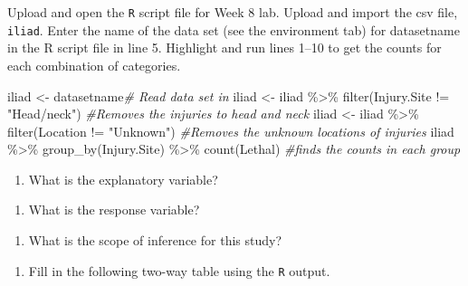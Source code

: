 \documentclass[
]{report}
\newenvironment{Shaded}{\begin{snugshade}}{\end{snugshade}}
\newcommand{\CommentTok}[1]{\textcolor[rgb]{0.56,0.35,0.01}{\textit{#1}}}
\newcommand{\FunctionTok}[1]{\textcolor[rgb]{0.00,0.00,0.00}{#1}}
\newcommand{\NormalTok}[1]{#1}
\newcommand{\OtherTok}[1]{\textcolor[rgb]{0.56,0.35,0.01}{#1}}
\newcommand{\SpecialCharTok}[1]{\textcolor[rgb]{0.00,0.00,0.00}{#1}}
\newcommand{\StringTok}[1]{\textcolor[rgb]{0.31,0.60,0.02}{#1}}
\providecommand{\tightlist}{%
  \setlength{\itemsep}{0pt}\setlength{\parskip}{0pt}}
\begin{document}
Upload and open the \texttt{R} script file for Week 8 lab. Upload and import the csv file, \texttt{iliad}. Enter the name of the data set (see the environment tab) for datasetname in the R script file in line 5. Highlight and run lines 1--10 to get the counts for each combination of categories.

\begin{Shaded}
\begin{Highlighting}[]
\NormalTok{iliad }\OtherTok{\textless{}{-}}\NormalTok{ datasetname}\CommentTok{\# Read data set in}
\NormalTok{iliad }\OtherTok{\textless{}{-}}\NormalTok{ iliad }\SpecialCharTok{\%\textgreater{}\%}
  \FunctionTok{filter}\NormalTok{(Injury.Site }\SpecialCharTok{!=} \StringTok{"Head/neck"}\NormalTok{) }\CommentTok{\#Removes the injuries to head and neck}
\NormalTok{iliad }\OtherTok{\textless{}{-}}\NormalTok{ iliad }\SpecialCharTok{\%\textgreater{}\%}
  \FunctionTok{filter}\NormalTok{(Location }\SpecialCharTok{!=} \StringTok{"Unknown"}\NormalTok{) }\CommentTok{\#Removes the unknown locations of injuries}
\NormalTok{iliad }\SpecialCharTok{\%\textgreater{}\%} \FunctionTok{group\_by}\NormalTok{(Injury.Site) }\SpecialCharTok{\%\textgreater{}\%} \FunctionTok{count}\NormalTok{(Lethal) }\CommentTok{\#finds the counts in each group}
\end{Highlighting}
\end{Shaded}

\begin{enumerate}
\def\labelenumi{\arabic{enumi}.}
\tightlist
\item
  What is the explanatory variable?
\end{enumerate}

\vspace{0.5in}

\begin{enumerate}
\def\labelenumi{\arabic{enumi}.}
\setcounter{enumi}{1}
\tightlist
\item
  What is the response variable?
\end{enumerate}

\vspace{0.5in}

\begin{enumerate}
\def\labelenumi{\arabic{enumi}.}
\setcounter{enumi}{2}
\tightlist
\item
  What is the scope of inference for this study?
\end{enumerate}

\newpage

\begin{enumerate}
\def\labelenumi{\arabic{enumi}.}
\setcounter{enumi}{3}
\tightlist
\item
  Fill in the following two-way table using the \texttt{R} output.
\end{enumerate}
\end{document}
